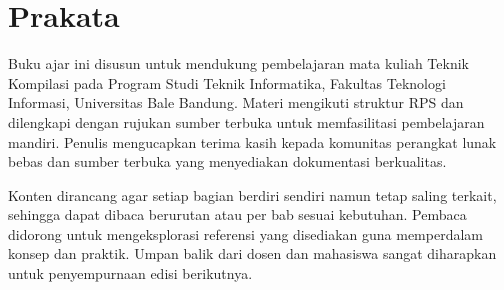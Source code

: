 \documentclass[../main.tex]{subfiles}
\begin{document}
\chapter*{Prakata}
Buku ajar ini disusun untuk mendukung pembelajaran mata kuliah Teknik Kompilasi pada Program Studi Teknik Informatika, Fakultas Teknologi Informasi, Universitas Bale Bandung. Materi mengikuti struktur RPS dan dilengkapi dengan rujukan sumber terbuka untuk memfasilitasi pembelajaran mandiri. Penulis mengucapkan terima kasih kepada komunitas perangkat lunak bebas dan sumber terbuka yang menyediakan dokumentasi berkualitas.

Konten dirancang agar setiap bagian berdiri sendiri namun tetap saling terkait, sehingga dapat dibaca berurutan atau per bab sesuai kebutuhan. Pembaca didorong untuk mengeksplorasi referensi yang disediakan guna memperdalam konsep dan praktik. Umpan balik dari dosen dan mahasiswa sangat diharapkan untuk penyempurnaan edisi berikutnya.
\end{document}
